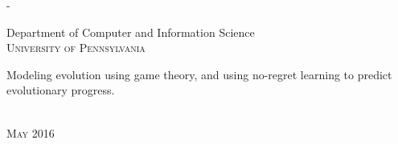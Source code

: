 \begin{titlingpage}
\begin{SingleSpace}
\begin{adjustwidth*}{\unitlength}{-\unitlength}
\begin{center}
\vspace{6mm}
{\large Department of Computer and Information Science\\
\textsc{University of Pennsylvania}}\\
\vspace{11mm}
\begin{minipage}{10cm}
Modeling evolution using game theory, and using no-regret learning to predict evolutionary progress.  
\end{minipage}\\
\vspace{9mm}
{\large\textsc{May 2016}}
\vspace{12mm}
\end{center}
\begin{flushright}
\end{flushright}
\end{adjustwidth*}
\end{SingleSpace}
\end{titlingpage}